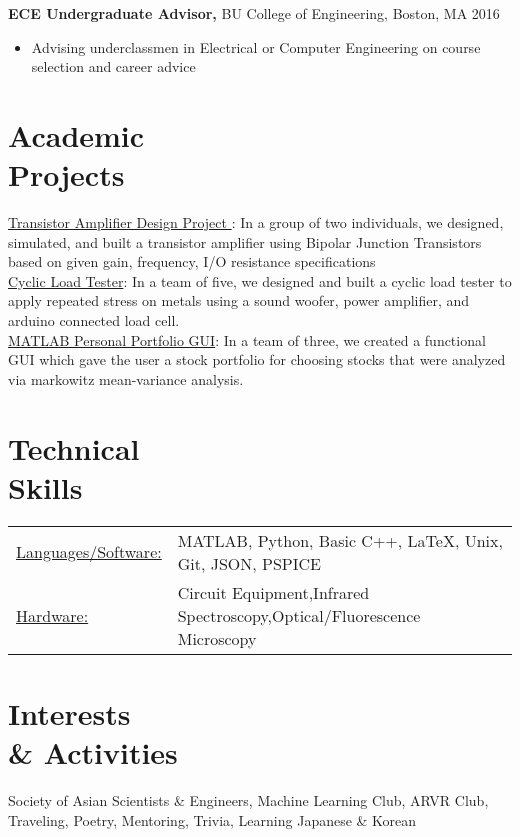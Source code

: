 \documentclass[margin]{res}
\begin{document}
\begin{resume}
\begin{itemize}
		 \end{itemize}
   {\bf ECE Undergraduate Advisor,} BU College of Engineering, Boston, MA    \hfill         2016 
                \begin{itemize} \itemsep -2pt
              \item Advising underclassmen in Electrical or Computer Engineering on course selection and career advice 
                 

		 \end{itemize}
		

\section{Academic \\ Projects} 
\underline{Transistor Amplifier Design Project }: In a group of two individuals, we designed, simulated, and built a transistor amplifier using Bipolar Junction Transistors based on given gain, frequency, I/O resistance specifications  \\
\underline{Cyclic Load Tester}: In a team of five, we designed and built a cyclic load tester to apply repeated stress on metals using a sound woofer, power amplifier, and arduino connected load cell. \\
\underline{MATLAB Personal Portfolio GUI}: In a team of three, we created a functional GUI which gave the user a stock portfolio for choosing stocks that were analyzed via markowitz mean-variance analysis. 
 

\section{Technical \\ Skills}
   \begin{tabular}{l p{4.5in}}
    \underline{Languages/Software:} & MATLAB, Python, Basic C++, LaTeX, Unix, Git, JSON, PSPICE\\
     \underline{Hardware:} & Circuit Equipment,Infrared Spectroscopy,Optical/Fluorescence Microscopy \\
 \end{tabular}
 
\section{Interests \\ \& Activities}
Society of Asian Scientists \& Engineers, Machine Learning Club, ARVR Club, Traveling, Poetry, Mentoring, Trivia, Learning Japanese \& Korean
\end{resume} 
\end{document}
